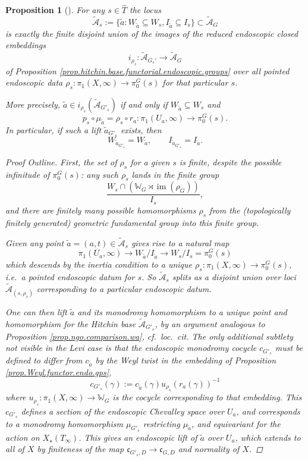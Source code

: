 \documentclass[openany]{amsbook}
\newtheorem{proposition}[theorem]{Proposition}
\theoremstyle{definition}
\theoremstyle{remark}
\numberwithin{equation}{section}
\newcommand{\W}{\mathbb{W}}
\newcommand{\cA}{\mathcal{A}}
\newcommand{\im}{\operatorname{im}}
\renewcommand{\-}{\operatorname{-}}
\newcommand{\wtilde}[1]{\widetilde{#1}}
\newcommand{\ctA}{\widetilde{\cA}}
\newcommand{\fc}{\mathfrak{c}}
\begin{document}
\begin{proposition}[{\cite[\S 6.3]{ngofl}}]\label{prop.endoscopic.locus.decomposition} For any $s \in \widehat{T}$ the locus 
$$
    \ctA_{s} := \{\wtilde{a} : W_{\wtilde{a}} \subseteq W_s, I_{\wtilde{a}} \subseteq I_s \} \subset \ctA_G
$$
is exactly the finite disjoint union of the images of the reduced endoscopic closed embeddings
$$
    i_{\rho_s} : \ctA_{G_s'} \to \ctA_G
$$
of Proposition \ref{prop.hitchin.base.functorial.endoscopic.groups} over all pointed endoscopic data $\rho_s : \pi_1(X, \infty) \to \pi_0^G(s)$ for that particular $s$. 

More precisely, $\wtilde{a} \in i_{\rho_s}(\ctA_{G'_s})$ if and only if $W_{\wtilde{a}} \subseteq W_s$ and
$$
    p_s \circ \mu_{\wtilde{a}} = \rho_{s} \circ r_a : \pi_1(U_a, \infty) \longrightarrow \pi_0^G(s).
$$
In particular, if such a lift $\wtilde{a}_{G'_s}$ exists, then 
$$
    W_{\wtilde{a}_{G'_s}} = W_{\wtilde{a}}, \qquad I_{\wtilde{a}_{G'_s}} = I_{\wtilde{a}}.
$$
\begin{proof}[Proof Outline] First, the set of $\rho_s$ for a given $s$ is finite, despite the possible infinitude of $\pi_0^G(s)$: any such $\rho_s$ lands in the finite group 
$$
    \frac{W_s \cap (\W_G \rtimes \im(\rho_G))}{I_s},
$$
and there are finitely many possible homomorphisms $\rho_s$ from the (topologically finitely generated) geometric fundamental group into this finite group. 

Given any point $\wtilde{a} = (a,t) \in \ctA_s$ gives rise to a natural map 
$$
    \pi_1(U_a, \infty) \to W_{\wtilde{a}}/I_{\wtilde{a}} \to W_s/I_s = \pi_0^G(s)
$$
which descends by the inertia condition to a unique $\rho_{s} : \pi_1(X, \infty) \to \pi_0^G(s)$, i.e.\ a pointed endoscopic datum for $s$. So $\ctA_s$ splits as a disjoint union over loci $\ctA_{(s,\rho_s)}$ corresponding to a particular endoscopic datum.

One can then lift $\wtilde{a}$ and its monodromy homomorphism to a unique point and homomorphism for the Hitchin base $\ctA_{G'_s}$, by an argument analogous to Proposition \ref{prop.ngo.comparison.wa}, cf.\ \textit{loc.\ cit.} The only additional subtlety not visible in the Levi case is that the endoscopic monodromy cocycle $c_{G'_s}$ must be defined to differ from $c_{\wtilde{a}}$ by the Weyl twist in the embedding of Proposition \ref{prop.Weyl.functor.endo.gps},
$$
    c_{G'_s}(\gamma) := c_{\wtilde{a}}(\gamma) u_{\rho_s}(r_a(\gamma))^{-1}
$$
where $u_{\rho_s} : \pi_1(X, \infty) \to \W_G$ is the cocycle corresponding to that embedding. This $c_{G'_s}$ defines a section of the endoscopic Chevalley space over $U_a$, and corresponds to a monodromy homomorphism $\mu_{G'_s}$ restricting $\mu_{\wtilde{a}}$, and equivariant for the action on $X_\star(T_\infty)$. This gives an endoscopic lift of $\wtilde{a}$ over $U_a$, which extends to all of $X$ by finiteness of the map $\fc_{G'_s, D} \to \fc_{G,D}$ and normality of $X$.
\end{proof}
\end{proposition}
\end{document}
